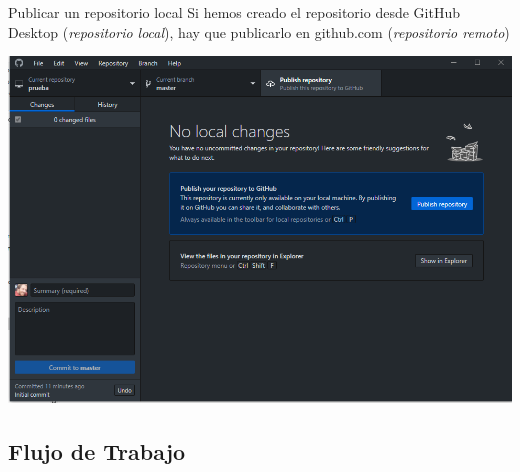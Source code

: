 \documentclass[xcolor={usenames,svgnames,dvipsnames}]{beamer}
\begin{document}
\begin{frame}[label={sec:org2fdbae6}]{Publicar un repositorio local}
Si hemos creado el repositorio desde GitHub Desktop (\emph{repositorio local}), hay que publicarlo en github.com (\emph{repositorio remoto})

\begin{center}
\includegraphics[width=.9\linewidth]{figs/Desktop_PublishRepository.png}
\end{center}
\end{frame}


\subsection{Flujo de Trabajo}
\label{sec:org61b9326}
\end{document}
